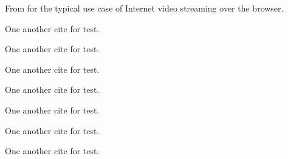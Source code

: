 \documentclass[a4paper,12pt]{report}
\begin{document}
From \cite{NamKim2014} for the typical use case of Internet video streaming over the browser.

One another cite \cite{DeqRao2016} for test.

One another cite \cite{GoyIII2012} for test.

One another cite \cite{ZarSut2014} for test.

One another cite \cite{ZhaChe2016} for test.

One another cite \cite{PenKan2016} for test.

One another cite \cite{LevGol2015} for test.

One another cite \cite{JonSiv2001} for test.



\end{document}
